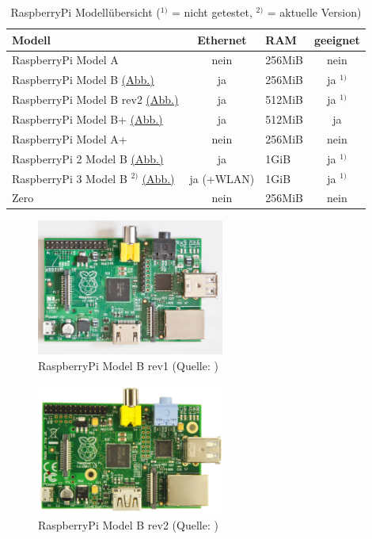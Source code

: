 \begin{table}[h!]
  \center
  \begin{tabular}{ l | c | l || c }
    \hline
    Modell & Ethernet & RAM & geeignet \\ \hline
    RaspberryPi Model A & nein & 256MiB & nein \\
    RaspberryPi Model B {\hyperref[fig:rpib1]{(Abb.)}} & ja & 256MiB & ja $^{1)}$ \\
    RaspberryPi Model B rev2 {\hyperref[fig:rpib2]{(Abb.)}} & ja & 512MiB & ja $^{1)}$ \\
    RaspberryPi Model B+ {\hyperref[fig:rpibplus]{(Abb.)}} & ja & 512MiB & ja \\
    RaspberryPi Model A+ & nein & 256MiB & nein \\
    RaspberryPi 2 Model B {\hyperref[fig:rpi2b]{(Abb.)}} & ja & 1GiB & ja $^{1)}$ \\
    RaspberryPi 3 Model B $^{2)}$ {\hyperref[fig:rpi3b]{(Abb.)}} & ja (+WLAN) & 1GiB & ja $^{1)}$ \\
    Zero & nein & 256MiB & nein \\
    \hline
  \end{tabular}
	\caption{RaspberryPi Modellübersicht ($^{1)}$ = nicht getestet, $^{2)}$ = aktuelle Version)}
	\label{tab:rpimodels}
\end{table}

\clearpage

\begin{figure}[h!]
	\centering
		\includegraphics[width=0.55\textwidth]{./fotos/Raspberry_Pi_B_rev_1.jpg}
	\caption{RaspberryPi Model B rev1 (Quelle: \cite{rpib1})}
	\label{fig:rpib1}
\end{figure}

\begin{figure}[h!]
	\centering
		\includegraphics[width=0.55\textwidth]{./fotos/Raspberry_Pi_B_rev_2.jpg}
	\caption{RaspberryPi Model B rev2 (Quelle: \cite{rpib2})}
	\label{fig:rpib2}
\end{figure}

